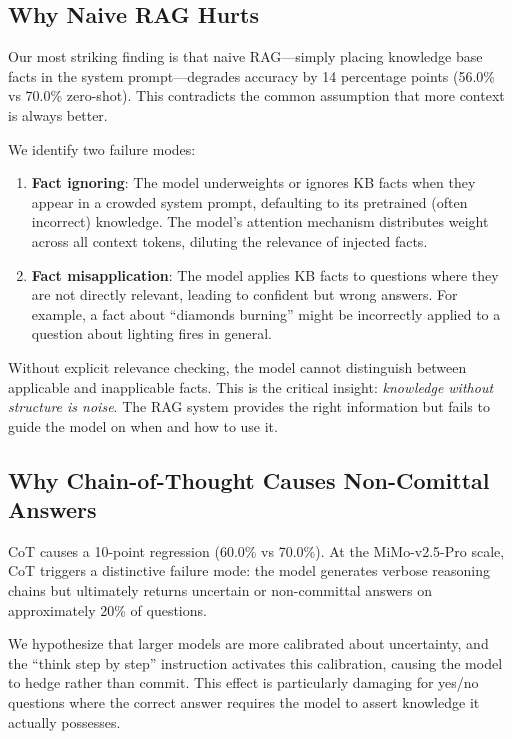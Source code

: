 \subsection{Why Naive RAG Hurts}

Our most striking finding is that naive RAG---simply placing knowledge base facts in the system prompt---degrades accuracy by 14 percentage points (56.0\% vs 70.0\% zero-shot). This contradicts the common assumption that more context is always better.

We identify two failure modes:

\begin{enumerate}
\item \textbf{Fact ignoring}: The model underweights or ignores KB facts when they appear in a crowded system prompt, defaulting to its pretrained (often incorrect) knowledge. The model's attention mechanism distributes weight across all context tokens, diluting the relevance of injected facts.

\item \textbf{Fact misapplication}: The model applies KB facts to questions where they are not directly relevant, leading to confident but wrong answers. For example, a fact about ``diamonds burning'' might be incorrectly applied to a question about lighting fires in general.
\end{enumerate}

Without explicit relevance checking, the model cannot distinguish between applicable and inapplicable facts. This is the critical insight: \emph{knowledge without structure is noise}. The RAG system provides the right information but fails to guide the model on when and how to use it.

\subsection{Why Chain-of-Thought Causes Non-Comittal Answers}

CoT causes a 10-point regression (60.0\% vs 70.0\%). At the MiMo-v2.5-Pro scale, CoT triggers a distinctive failure mode: the model generates verbose reasoning chains but ultimately returns uncertain or non-committal answers on approximately 20\% of questions.

We hypothesize that larger models are more calibrated about uncertainty, and the ``think step by step'' instruction activates this calibration, causing the model to hedge rather than commit. This effect is particularly damaging for yes/no questions where the correct answer requires the model to assert knowledge it actually possesses.

